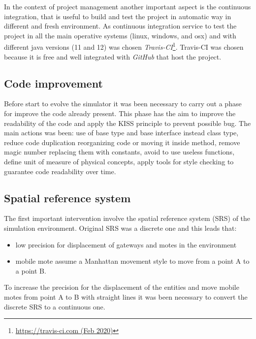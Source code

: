 In the context of project management another important aspect is the continuous integration, that is useful to build and test the project in automatic way in different and fresh environment. 
As continuous integration service to test the project in all the main operative systems (linux, windows, and osx) and with different java versions (11 and 12) was chosen \textit{Travis-CI}\footnote{\href{https://travis-ci.com/}{https://travis-ci.com (Feb 2020)}}.
Travis-CI was chosen because it is free and well integrated with \textit{GitHub} that host the project.

\subsection{Code improvement}
Before start to evolve the simulator it was been necessary to carry out a phase for improve the code already present. 
This phase has the aim to improve the readability of the code and apply the KISS principle to prevent possible bug.
The main actions was been: use of base type and base interface instead class type, reduce code duplication reorganizing code or moving it inside method, remove magic number replacing them with constants, avoid to use useless functions, define unit of measure of physical concepts, apply tools for style checking to guarantee code readability over time.

\subsection{Spatial reference system}
The first important intervention involve the spatial reference system (SRS) of the simulation environment. Original SRS was a discrete one and this leads that:
\begin{itemize}
    \item low precision for displacement of gateways and motes in the environment
    \item mobile mote assume a Manhattan movement style to move from a point A to a point B. 
\end{itemize}  
To increase the precision for the displacement of the entities and move mobile motes from point A to B with straight lines it was been necessary to convert the discrete SRS to a continuous one. 

